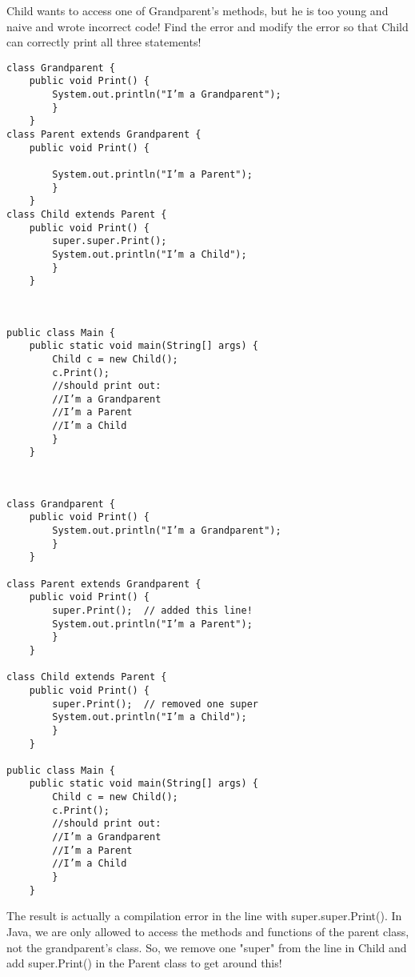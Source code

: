 \begin{blocksection}
\question Child wants to access one of Grandparent's methods, but he is too young and naive and wrote incorrect code! Find the error and modify the error so that Child can correctly print all three statements!

\begin{lstlisting}
class Grandparent {
    public void Print() {
        System.out.println("I’m a Grandparent");
        }
    }
class Parent extends Grandparent {
    public void Print() {
        
        System.out.println("I’m a Parent");
        }
    }
class Child extends Parent {
    public void Print() {
        super.super.Print();
        System.out.println("I’m a Child");
        }
    }
\end{lstlisting}\\
\begin{lstlisting}
public class Main {
    public static void main(String[] args) {
        Child c = new Child();
        c.Print(); 
        //should print out:
        //I’m a Grandparent
        //I’m a Parent
        //I’m a Child
        }
    }

\end{lstlisting}\\
\bigskip 
\end{blocksection}

\begin{solution}
\begin{verbatim}
class Grandparent {
    public void Print() {
        System.out.println("I’m a Grandparent");
        }
    }
  
class Parent extends Grandparent {
    public void Print() {
        super.Print();  // added this line!
        System.out.println("I’m a Parent");
        }
    }
  
class Child extends Parent {
    public void Print() {
        super.Print();  // removed one super
        System.out.println("I’m a Child");
        }
    }
  
public class Main {
    public static void main(String[] args) {
        Child c = new Child();
        c.Print(); 
        //should print out:
        //I’m a Grandparent
        //I’m a Parent
        //I’m a Child
        }
    }

\end{verbatim}
The result is actually a compilation error in the line with super.super.Print(). In Java, we are only allowed to access the methods and functions of the parent class, not the grandparent's class. So, we remove one "super" from the line in Child and add super.Print() in the Parent class to get around this!

\end{solution}

